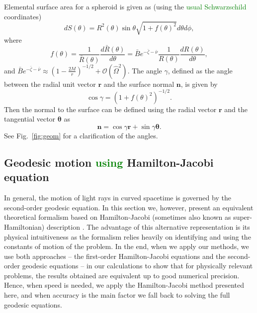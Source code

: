 \documentclass{aa}
\newcommand{\be}{\begin{equation}}
\newcommand{\ee}{\end{equation}}
\renewcommand{\vec}[1]{\ensuremath{\boldsymbol{#1}}}
\newcommand{\refe}[1]{\textcolor{green}{{#1}}}
\newcommand{\sch}{Schwarzschild }
\newcommand{\Ob}{\ensuremath{\hat{\Omega}}}
\newcommand{\nub}{\ensuremath{\bar{\nu}}}
\newcommand{\zetab}{\ensuremath{\bar{\zeta}}}
\newcommand{\Bb}{\ensuremath{\bar{B}}}
\begin{document}
Elemental surface area for a spheroid is given as (using the \refe{usual \sch} coordinates)
\be
dS(\theta) = R^2(\theta) \sin\theta \sqrt{1 + f(\theta)^2}d\theta d\phi,
\ee
where
\be
f(\theta) = \frac{1}{\bar{R}(\theta)} \frac{d \bar{R}(\theta)}{d \theta} 
= \Bb e^{-\zetab-\nub} \frac{1}{R(\theta)} \frac{dR(\theta)}{d\theta}, 
\ee
and $\Bb e^{-\zetab-\nub} \approx \left(1-\frac{2 M}{r}\right)^{-1/2} + \mathcal{O}(\Ob^2)$.
The angle $\gamma$, defined as the angle between the radial unit vector $\vec{r}$ and the surface normal $\vec{n}$, is given by
\be
\cos\gamma = \left(1 + f(\theta)^2\right)^{-1/2}.
\ee
Then the normal to the surface can be defined using the radial vector $\vec{r}$ and the tangential vector $\vec{\theta}$ as
\be\label{eq:surf_norm}
\vec{n} = \cos\gamma \vec{r} + \sin\gamma \vec{\theta}.
\ee
See Fig.~\ref{fig:geom} for a clarification of the angles.



\subsection{Geodesic motion \refe{using} Hamilton-Jacobi equation}\label{sect:hamjac}
In general, the motion of light rays in curved spacetime is governed by the second-order geodesic equation.
In this section we, however, present an equivalent theoretical formalism based on Hamilton-Jacobi (sometimes also known as super-Hamiltonian) description \citep{MTW73, cha}.
The advantage of this alternative representation is its physical intuitiveness as the formalism relies heavily on identifying and using the constants of motion of the problem.
In the end, when we apply our methods, we use both approaches -- the first-order Hamilton-Jacobi equations and the second-order geodesic equations -- in our calculations to show that for physically relevant problems, the results obtained are equivalent up to good numerical precision.
Hence, when speed is needed, we apply the Hamilton-Jacobi method presented here, and when accuracy is the main factor we fall back to solving the full geodesic equations.
\end{document}
